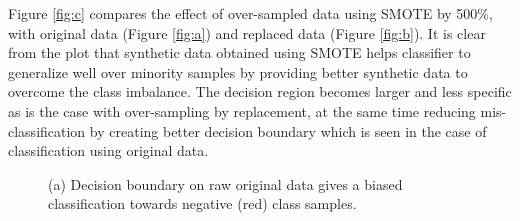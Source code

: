 \documentclass[10pt,journal,compsoc]{IEEEtran}
\begin{document}
Figure \ref{fig:c} compares the effect of over-sampled data using SMOTE by 500\%, with original data (Figure \ref{fig:a}) and replaced data (Figure \ref{fig:b}).
It is clear from the plot that synthetic data obtained using SMOTE helps classifier to generalize well over minority samples by providing better synthetic data to overcome the class imbalance.
The decision region becomes larger and less specific as is the case with over-sampling by replacement, at the same time reducing mis-classification by creating better decision boundary which is seen in the case of classification using original data.


\begin{figure}[!t]
\centering
{}
\hfil
{}
\hfil
{}
\caption{(a) Decision boundary on raw original data gives a biased classification towards negative (red) class samples.}
\label{fig:compare}
\end{figure}
\end{document}
